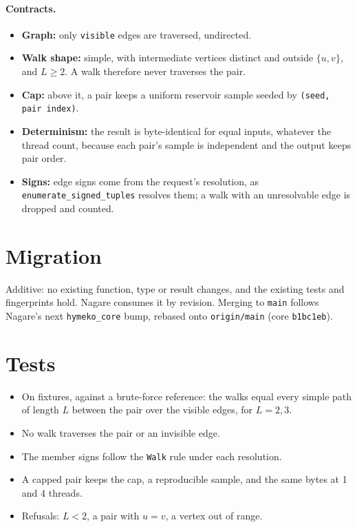 \documentclass[10pt]{article}
\begin{document}
\paragraph{Contracts.}
\begin{itemize}
\item \textbf{Graph:} only \texttt{visible} edges are traversed, undirected.
\item \textbf{Walk shape:} simple, with intermediate vertices distinct and outside $\{u,v\}$, and $L\ge2$. A walk
  therefore never traverses the pair.
\item \textbf{Cap:} above it, a pair keeps a uniform reservoir sample seeded by \texttt{(seed, pair index)}.
\item \textbf{Determinism:} the result is byte-identical for equal inputs, whatever the thread count, because each
  pair's sample is independent and the output keeps pair order.
\item \textbf{Signs:} edge signs come from the request's resolution, as \texttt{enumerate\_signed\_tuples} resolves
  them; a walk with an unresolvable edge is dropped and counted.
\end{itemize}

\section*{Migration}
Additive: no existing function, type or result changes, and the existing tests and fingerprints hold. Nagare
consumes it by revision. Merging to \texttt{main} follows Nagare's next \texttt{hymeko\_core} bump, rebased onto
\texttt{origin/main} (core \texttt{b1bc1eb}).

\section*{Tests}
\begin{itemize}
\item On fixtures, against a brute-force reference: the walks equal every simple path of length $L$ between the pair
  over the visible edges, for $L=2,3$.
\item No walk traverses the pair or an invisible edge.
\item The member signs follow the \texttt{Walk} rule under each resolution.
\item A capped pair keeps the cap, a reproducible sample, and the same bytes at 1 and 4 threads.
\item Refusals: $L<2$, a pair with $u=v$, a vertex out of range.
\end{itemize}
\end{document}
